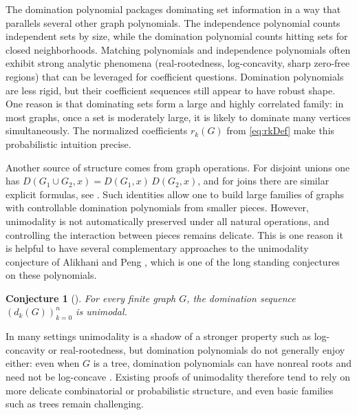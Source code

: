 \documentclass[11pt]{amsart}
\newtheorem{conjecture}[theorem]{Conjecture}
\numberwithin{equation}{section}
\begin{document}
The domination polynomial packages dominating set information in a way that parallels several other graph polynomials. The independence polynomial counts independent sets by size, while the domination polynomial counts hitting sets for closed neighborhoods. Matching polynomials and independence polynomials often exhibit strong analytic phenomena (real-rootedness, log-concavity, sharp zero-free regions) that can be leveraged for coefficient questions. Domination polynomials are less rigid, but their coefficient sequences still appear to have robust shape. One reason is that dominating sets form a large and highly correlated family: in most graphs, once a set is moderately large, it is likely to dominate many vertices simultaneously. The normalized coefficients $r_k(G)$ from \eqref{eq:rkDef} make this probabilistic intuition precise.

Another source of structure comes from graph operations. For disjoint unions one has $D(G_1\cup G_2,x)=D(G_1,x)\,D(G_2,x)$, and for joins there are similar explicit formulas, see \cite{KotekTittmannTrinks2012}.
Such identities allow one to build large families of graphs with controllable domination polynomials from smaller pieces. However, unimodality is not automatically preserved under all natural operations, and controlling the interaction between pieces remains delicate. This is one reason it is helpful to have several complementary approaches to the unimodality conjecture of Alikhani and Peng \cite{AlikhaniPeng2014}, which is one of the long standing conjectures on these polynomials.

\begin{conjecture}[\cite{AlikhaniPeng2014}]\label{conj:unimodal}
For every finite graph $G$, the domination sequence $(d_k(G))_{k=0}^{n}$ is unimodal.
\end{conjecture}

In many settings unimodality is a shadow of a stronger property such as log-concavity or real-rootedness, but domination polynomials do not generally enjoy either: even when $G$ is a tree, domination polynomials can have nonreal roots and need not be log-concave \cite{BeatonBrown2022}. Existing proofs of unimodality therefore tend to rely on more delicate combinatorial or probabilistic structure, and even basic families such as trees remain challenging.
\end{document}

